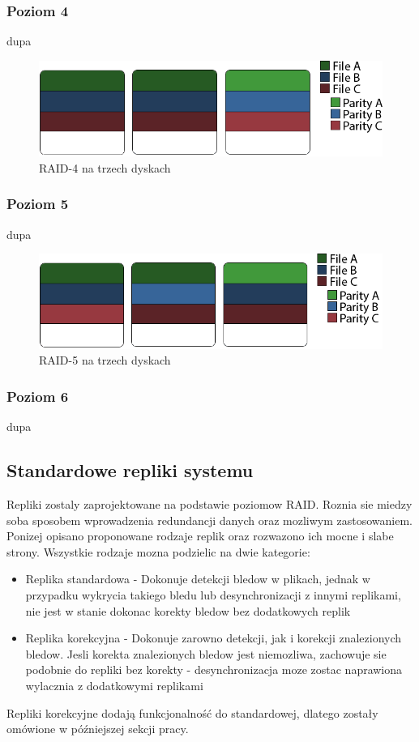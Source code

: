 \subsubsection{Poziom 4}
dupa
\begin{figure}[h!]
        \centering
        \includegraphics{raid-4.png}
        \caption{RAID-4 na trzech dyskach}
        \label{fig:raid4}
\end{figure}
\subsubsection{Poziom 5}
dupa
\begin{figure}[h!]
        \centering
        \includegraphics{raid-5.png}
        \caption{RAID-5 na trzech dyskach}
        \label{fig:raid5}
\end{figure}
\subsubsection{Poziom 6}
dupa

\subsection{Standardowe repliki systemu}
Repliki zostaly zaprojektowane na podstawie poziomow RAID. Roznia sie miedzy soba sposobem wprowadzenia redundancji danych oraz mozliwym zastosowaniem. Ponizej opisano proponowane rodzaje replik oraz rozwazono ich mocne i slabe strony. Wszystkie rodzaje mozna podzielic na dwie kategorie:
\begin{itemize}
    \item Replika standardowa - Dokonuje detekcji bledow w plikach, jednak w przypadku wykrycia takiego bledu lub desynchronizacji z innymi replikami, nie jest w stanie dokonac korekty bledow bez dodatkowych replik
    \item Replika korekcyjna - Dokonuje zarowno detekcji, jak i korekcji znalezionych bledow. Jesli korekta znalezionych bledow jest niemozliwa, zachowuje sie podobnie do repliki bez korekty - desynchronizacja moze zostac naprawiona wylacznia z dodatkowymi replikami
\end{itemize}
Repliki korekcyjne dodają funkcjonalność do standardowej, dlatego zostały omówione w późniejszej sekcji pracy. 


